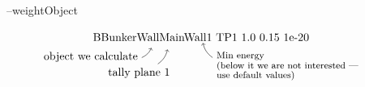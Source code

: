 \begin{description}
\item[--weightObject] 
$\underset{
  \begin{tikzpicture}
    \node[below left] at (-1,0) {object we calculate};  \draw[->](-1.0, -0.3) to[bend right=20] ++(0.3,2ex);
    \node[below left] at (0,-0.5) {tally plane 1};      \draw[->](-0.5, -0.5) to[bend right=20] ++(0.3,3ex);
    \node[below right] at (1.2,0.0) {\footnotesize{Min energy}};      \draw[->](1.2, -0.3) to[bend left=20] ++(-0.3,3ex);
    \node[below right] at (1.2,-0.3) {\footnotesize{(below it we are not interested~---}};
    \node[below right] at (1.2,-0.6) {\footnotesize{use default values)}};
  \end{tikzpicture}
}{\text{BBunkerWallMainWall1 TP1 1.0 0.15 1e-20}}$

\end{description}


